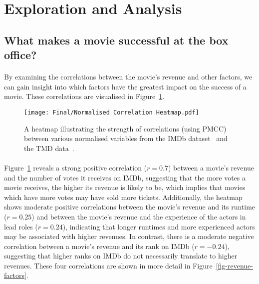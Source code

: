 \section{Exploration and Analysis}
    \subsection{What makes a movie successful at the box office?}
        \begin{multicols}{2}
            \paragraph{}
                By examining the correlations between the movie's revenue and other factors, we
                    can gain insight into which factors have the greatest impact on the success of
                    a movie.
                These correlations are visualised in Figure~\ref{fig-heatmap}.

                \begin{figure}[H]
                    \centering
                    \texttt{[image: Final/Normalised Correlation Heatmap.pdf]}
                    \caption{
                        A heatmap illustrating the strength of correlations (using PMCC) between various normalised
                        variables from the IMDb dataset~\cite{data:IMDb} and the TMD
                        data~\cite{data:TMD}.
                    }\label{fig-heatmap}
                \end{figure}

            \paragraph{}
                Figure~\ref{fig-heatmap} reveals a strong positive correlation ($r=0.7$)
                    between a movie's revenue and the number of votes it receives on IMDb,
                    suggesting that the more votes a movie receives, the higher its revenue is
                    likely to be, which implies that movies which have more votes may have sold
                    more tickets.
                Additionally, the heatmap shows moderate positive correlations between the
                    movie's revenue and its runtime ($r=0.25$) and between the movie's revenue and
                    the experience of the actors in lead roles ($r=0.24$), indicating that longer
                    runtimes and more experienced actors may be associated with higher revenues.
                In contrast, there is a moderate negative correlation between a movie's revenue
                    and its rank on IMDb ($r=-0.24$), suggesting that higher ranks on IMDb do not
                    necessarily translate to higher revenues.
                These four correlations are shown in more detail in
                    Figure~\ref{fig-revenue-factors}.


\end{multicols}
